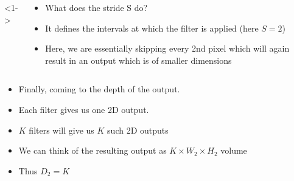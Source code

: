 \begin{frame}
\begin{columns}
\begin{overlayarea}{\textwidth}{\textheight}
		\end{overlayarea}
		        
		<1->
		\begin{overlayarea}{\textwidth}{\textheight}
			\begin{itemize}
				\item<1-> What does the stride S do?
				\item<2-> It defines the intervals at which the filter is applied (here $S=2$)
				\item<3-> Here, we are essentially skipping every 2nd pixel which will again result in an output which is of smaller dimensions
			\end{itemize}
		\end{overlayarea}
	\end{columns}
\end{frame}


\begin{frame}
	\begin{columns}
		
		\begin{overlayarea}{\textwidth}{\textheight}
			
		\end{overlayarea}
		
		\begin{overlayarea}{\textwidth}{\textheight}
			\justifying
			\begin{itemize}
				\justifying
				\item<1-> Finally, coming to the depth of the output.
				\item<2-> Each filter gives us one 2D output.
				\item<3-> $K$ filters will give us $K$ such 2D outputs
				\item<4-> We can think of the resulting output as $K\times W_2 \times H_2$
				volume
				\item<5-> Thus $D_2=K$
				
			\end{itemize}
		\end{overlayarea}
	\end{columns}
\end{frame}

